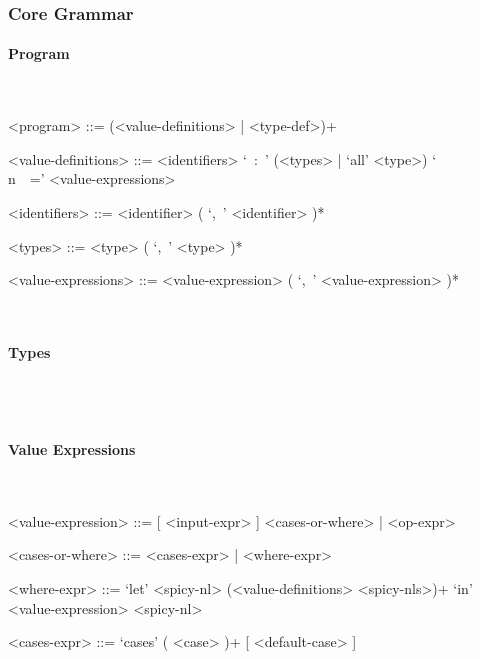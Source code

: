 \documentclass{article}
\begin{document}
\subsubsection{Core Grammar}

\setlength{\grammarparsep}{20pt}
\setlength{\grammarindent}{12em}

\paragraph{Program}
\hspace{1cm}\\
\begin{grammar}

<program> ::= (<value-definitions> | <type-def>)+

<value-definitions> ::=
<identifiers> `\ :\ ' (<types> | `all' <type>) `\\n\ \ =' <value-expressions>

<identifiers> ::= <identifier> ( `,\ ' <identifier> )*  

<types> ::= <type> ( `,\ ' <type> )*  

<value-expressions> ::= <value-expression> ( `,\ ' <value-expression> )*  

\end{grammar}
\hspace{1cm}\\

\paragraph{Types}

\hspace{1cm}\\


\hspace{1cm}\\

\paragraph{Value Expressions}

\hspace{1cm}\\
\begin{grammar}

<value-expression> ::= [ <input-expr> ] <cases-or-where> | <op-expr>

<cases-or-where> ::= <cases-expr> | <where-expr>

<where-expr> ::=
`let' <spicy-nl> (<value-definitions> <spicy-nls>)+ `in' <value-expression> <spicy-nl>

<cases-expr> ::= `cases' ( <case> )+ [ <default-case> ]

\end{grammar}
\end{document}
